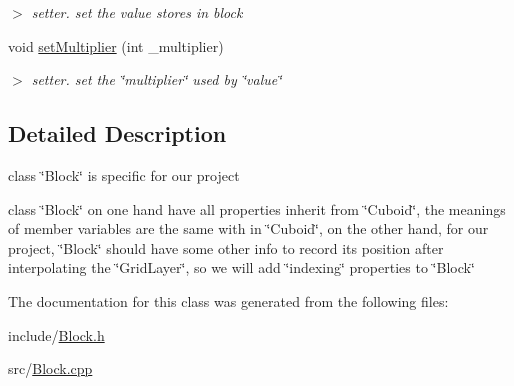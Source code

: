 \begin{DoxyCompactItemize}
\begin{DoxyCompactList}\small\item\em $>$ setter. set the value stores in block \end{DoxyCompactList}\item 
\hypertarget{classBlock_a96cc83144bdea419727df03687a1be63}{void \hyperlink{classBlock_a96cc83144bdea419727df03687a1be63}{set\-Multiplier} (int \-\_\-multiplier)}\label{classBlock_a96cc83144bdea419727df03687a1be63}

\begin{DoxyCompactList}\small\item\em $>$ setter. set the \char`\"{}multiplier\char`\"{} used by \char`\"{}value\char`\"{} \end{DoxyCompactList}\end{DoxyCompactItemize}


\subsection{\-Detailed \-Description}
class \char`\"{}\-Block\char`\"{} is specific for our project 

class \char`\"{}\-Block\char`\"{} on one hand have all properties inherit from \char`\"{}\-Cuboid\char`\"{}, the meanings of member variables are the same with in \char`\"{}\-Cuboid\char`\"{}, on the other hand, for our project, \char`\"{}\-Block\char`\"{} should have some other info to record its position after interpolating the \char`\"{}\-Grid\-Layer\char`\"{}, so we will add \char`\"{}indexing\char`\"{} properties to \char`\"{}\-Block\char`\"{} 

\-The documentation for this class was generated from the following files\-:\begin{DoxyCompactItemize}
\item 
include/\hyperlink{Block_8h}{\-Block.\-h}\item 
src/\hyperlink{Block_8cpp}{\-Block.\-cpp}\end{DoxyCompactItemize}
